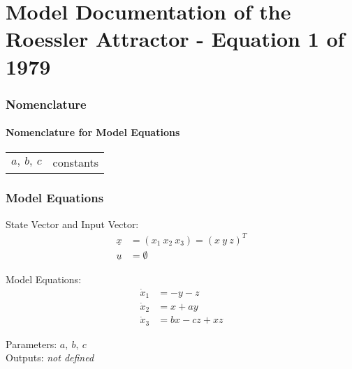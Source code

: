 \documentclass[10pt,a4paper]{article}
\begin{document}
	\part*{Model Documentation of the \\ Roessler Attractor - Equation 1 of 1979} %
	
	
	\section{Nomenclature} %
	\subsection{Nomenclature for Model Equations} %
	
	\begin{tabular}{ll}
		$a,~b,~c$ & constants		
	\end{tabular}
	
	
	\section{Model Equations} %
	
	State Vector and Input Vector:
	\begin{align*}
		\underline{x} &= (x_1 \ x_2 \ x_3) = (x \ y \ z)^T \\
		\underline{u} &= \emptyset
	\end{align*}
	
	\noindent Model Equations:
	\begin{subequations}
	\begin{align}
		\dot{x}_1 &= - y - z	\\
		\dot{x}_2 &= x + ay \\
		\dot{x}_3 &= bx - cz + xz    
	\end{align}
	\end{subequations}

	\noindent
	Parameters: $a, \ b, \ c$ %
	\\
	Outputs:  \textit{\textlangle not defined\textrangle}
	
	
\end{document}
